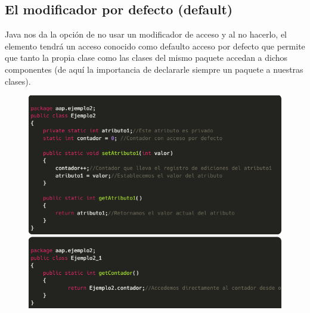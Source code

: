 \documentclass[12pt,a4paper]{report}
\begin{document}
{\subsection*{El modificador por defecto (default)}
Java nos da la opción de no usar un modificador de acceso y al no hacerlo, el elemento tendrá un acceso conocido como defaulto acceso por defecto que permite que tanto la propia clase como las clases del mismo paquete accedan a dichos componentes (de aquí la importancia de declararle siempre un paquete a nuestras clases).
\begin{figure}[hbtp]
\centering
\includegraphics[scale=0.4]{3.PNG}
\end{figure}
}
\end{document}
